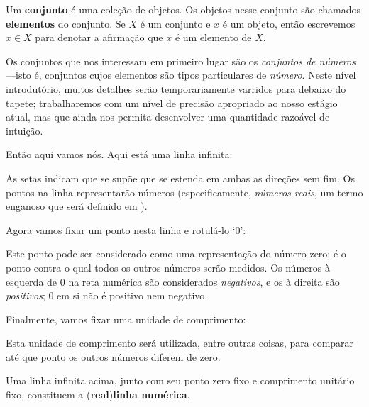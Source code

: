 \begin{definition}
\label{defSetsPreliminary}
Um \textbf{conjunto} é uma coleção de objetos. Os objetos nesse conjunto são chamados \textbf{elementos} do conjunto. Se $X$ é um conjunto e $x$ é um objeto, então escrevemos $x \in X$  para denotar a afirmação que $x$ é um elemento de $X$.
\end{definition}

Os conjuntos que nos interessam em primeiro lugar são os \textit{conjuntos de números}---isto é, conjuntos cujos elementos são tipos particulares de \textit{número}. Neste nível introdutório, muitos detalhes serão temporariamente varridos para debaixo do tapete; trabalharemos com um nível de precisão apropriado ao nosso estágio atual, mas que ainda nos permita desenvolver uma quantidade razoável de intuição.

Então aqui vamos nós. Aqui está uma linha infinita:
\begin{center}
\end{center}
As setas indicam que se supõe que se estenda em ambas as direções sem fim. Os pontos na linha representarão números (especificamente, \textit{números reais}, um termo enganoso que será definido em ).

Agora vamos fixar um ponto nesta linha e rotulá-lo `$0$':
\begin{center}
\end{center}
Este ponto pode ser considerado como uma representação do número zero; é o ponto contra o qual todos os outros números serão medidos. Os números à esquerda de $0$ na reta numérica são considerados \textit{negativos}, e os à direita são \textit{positivos}; $0$ em si não é positivo nem negativo.

Finalmente, vamos fixar uma unidade de comprimento:
\begin{center}
\end{center}
Esta unidade de comprimento será utilizada, entre outras coisas, para comparar até que ponto os outros números diferem de zero.
\begin{definition}
\label{defNumberLine}
Uma linha infinita acima, junto com seu ponto zero fixo e comprimento unitário fixo, constituem a (\textbf{real})\textbf{linha numérica}.
\end{definition}

